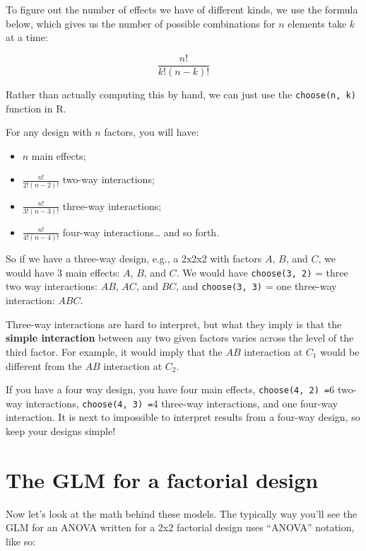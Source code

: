 \documentclass[]{book}
\providecommand{\tightlist}{%
  \setlength{\itemsep}{0pt}\setlength{\parskip}{0pt}}
\begin{document}
To figure out the number of effects we have of different kinds, we use the formula below, which gives us the number of possible combinations for \(n\) elements take \(k\) at a time:

\[\frac{n!}{k!(n - k)!}\]

Rather than actually computing this by hand, we can just use the \texttt{choose(n,\ k)} function in R.

For any design with \(n\) factors, you will have:

\begin{itemize}
\tightlist
\item
  \(n\) main effects;
\item
  \(\frac{n!}{2!(n - 2)!}\) two-way interactions;
\item
  \(\frac{n!}{3!(n - 3)!}\) three-way interactions;
\item
  \(\frac{n!}{4!(n - 4)!}\) four-way interactions\ldots{} and so forth.
\end{itemize}

So if we have a three-way design, e.g., a 2x2x2 with factors \(A\), \(B\), and \(C\), we would have 3 main effects: \(A\), \(B\), and \(C\). We would have \texttt{choose(3,\ 2)} = three two way interactions: \(AB\), \(AC\), and \(BC\), and \texttt{choose(3,\ 3)} = one three-way interaction: \(ABC\).

Three-way interactions are hard to interpret, but what they imply is that the \textbf{simple interaction} between any two given factors varies across the level of the third factor. For example, it would imply that the \(AB\) interaction at \(C_1\) would be different from the \(AB\) interaction at \(C_2\).

If you have a four way design, you have four main effects, \texttt{choose(4,\ 2)\ =}6 two-way interactions, \texttt{choose(4,\ 3)\ =}4 three-way interactions, and one four-way interaction. It is next to impossible to interpret results from a four-way design, so keep your designs simple!

\hypertarget{the-glm-for-a-factorial-design}{%
\section{The GLM for a factorial design}\label{the-glm-for-a-factorial-design}}

Now let's look at the math behind these models. The typically way you'll see the GLM for an ANOVA written for a 2x2 factorial design uses ``ANOVA'' notation, like so:
\end{document}
